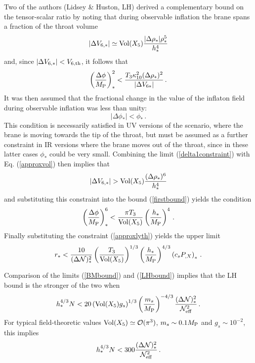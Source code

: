 Two of the authors (Lidsey \& Huston, LH) derived a complementary bound on the 
tensor-scalar ratio by noting that during observable inflation
the brane spans a fraction of the throat volume \cite{lidseyhuston}
\begin{equation}
\label{approxvol}
| \Delta V_{6,*} | \simeq \mathrm{Vol} (X_5) \frac{| \Delta \rho_*| \rho_*^5}{h_*^4}
\end{equation}
and, since $| \Delta V_{6,*} |< 
V_{6,{\rm th}}$, it follows that 
\begin{equation}
\label{firstbound}
\left(\frac{\Delta \phi}{M_{\rm P}}\right)^2_* < \frac{T_3 \kappa_{10}^2
(\Delta \rho_*)^2}{| \Delta V_{6*}|} \,.
\end{equation}
It was then assumed that the fractional change in the value of the 
inflaton field during observable inflation was less than unity:
\begin{equation}
\label{delta1constraint}
|\Delta \phi_* | <  \phi_* \,.
\end{equation} 
This condition is necessarily satisfied in UV
versions of the scenario, 
where the brane is moving towards the tip of the throat, but must be 
assumed as a further constraint in IR versions 
where the brane moves out of the throat, since in these latter cases
$\phi_*$ could be very small. Combining the limit 
(\ref{delta1constraint}) with Eq. (\ref{approxvol}) then implies that 
\begin{equation}
| \Delta V_{6,*} | > \mathrm{Vol} (X_5) \frac{( \Delta \rho_* )^6}{h_*^4}
\end{equation}
and substituting this constraint into the bound (\ref{firstbound}) yields 
the condition 
\begin{equation}
\left( \frac{\Delta \phi}{M_{\rm P}} \right)_*^6 < \frac{\pi T_3}{\mathrm{Vol} (X_5)} 
\left( \frac{h_*}{M_{\rm P}} \right)^4 \,.
\end{equation}
Finally substituting the constraint (\ref{approxlyth}) 
yields the upper limit \cite{lidseyhuston}
\begin{equation}
\label{LHbound}
r_* < \frac{10}{(\Delta {\cal{N}})_*^2} \left( \frac{T_3}{\mathrm{Vol} (X_5)} \right)^{1/3} 
\left( \frac{h_*}{M_{\rm P}} \right)^{4/3} \left( c_s P_{,X} \right)_* \,.
\end{equation}

Comparison of the limits (\ref{BMbound}) and (\ref{LHbound})
implies that the LH bound is the stronger of the two when
\begin{equation}
\label{LHstronger}
h_*^{4/3}N < 20 \left( \mathrm{Vol} (X_5) g_s \right)^{1/3}  
\left( \frac{m_s}{M_{\rm P}} \right)^{-4/3} 
\frac{( \Delta {\cal{N}} )_*^2}{{\cal{N}}^2_{\rm eff}} \,.
\end{equation}
For typical field-theoretic values $\mathrm{Vol} (X_5) \simeq \mathcal{O}(\pi^3)$, $m_s \sim
0.1 M_{\rm P}$ 
and  $g_s \sim 10^{-2}$, this implies 
\begin{equation}
\label{LHstronger1}
h_*^{4/3} N < 300 \frac{(\Delta {\cal{N}})^2_*}{{\cal{N}}_{\rm eff}^2} \,.
\end{equation}

